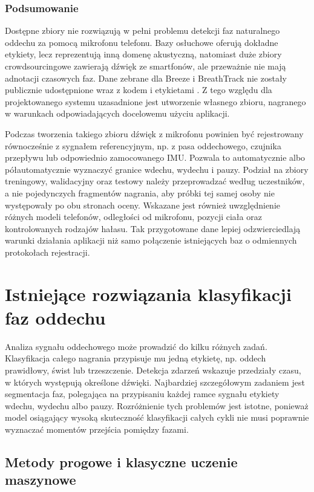 \subsubsection{Podsumowanie}
Dostępne zbiory nie rozwiązują w pełni problemu detekcji faz naturalnego oddechu za pomocą mikrofonu telefonu. Bazy osłuchowe oferują dokładne etykiety, lecz reprezentują inną domenę akustyczną, natomiast duże zbiory crowdsourcingowe zawierają dźwięk ze smartfonów, ale przeważnie nie mają adnotacji czasowych faz. Dane zebrane dla Breeze i BreathTrack nie zostały publicznie udostępnione wraz z kodem i etykietami \cite{10.1145/3369835,10.1145/3478123}. Z tego względu dla projektowanego systemu uzasadnione jest utworzenie własnego zbioru, nagranego w warunkach odpowiadających docelowemu użyciu aplikacji.

Podczas tworzenia takiego zbioru dźwięk z mikrofonu powinien być rejestrowany równocześnie z sygnałem referencyjnym, np. z pasa oddechowego, czujnika przepływu lub odpowiednio zamocowanego IMU. Pozwala to automatycznie albo półautomatycznie wyznaczyć granice wdechu, wydechu i pauzy. Podział na zbiory treningowy, walidacyjny oraz testowy należy przeprowadzać według uczestników, a nie pojedynczych fragmentów nagrania, aby próbki tej samej osoby nie występowały po obu stronach oceny. Wskazane jest również uwzględnienie różnych modeli telefonów, odległości od mikrofonu, pozycji ciała oraz kontrolowanych rodzajów hałasu. Tak przygotowane dane lepiej odzwierciedlają warunki działania aplikacji niż samo połączenie istniejących baz o odmiennych protokołach rejestracji.

\newpage

\section{Istniejące rozwiązania klasyfikacji faz oddechu}

Analiza sygnału oddechowego może prowadzić do kilku różnych zadań. Klasyfikacja całego nagrania przypisuje mu jedną etykietę, np. oddech prawidłowy, świst lub trzeszczenie. Detekcja zdarzeń wskazuje przedziały czasu, w których występują określone dźwięki. Najbardziej szczegółowym zadaniem jest segmentacja faz, polegająca na przypisaniu każdej ramce sygnału etykiety wdechu, wydechu albo pauzy. Rozróżnienie tych problemów jest istotne, ponieważ model osiągający wysoką skuteczność klasyfikacji całych cykli nie musi poprawnie wyznaczać momentów przejścia pomiędzy fazami.

\subsection{Metody progowe i klasyczne uczenie maszynowe}

